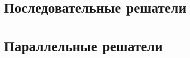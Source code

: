 \startrelatedwork

\section{Последовательные решатели}\label{overview:sequential}

\section{Параллельные решатели}\label{overview:parallel}

\finishrelatedwork

\chapterconclusion
